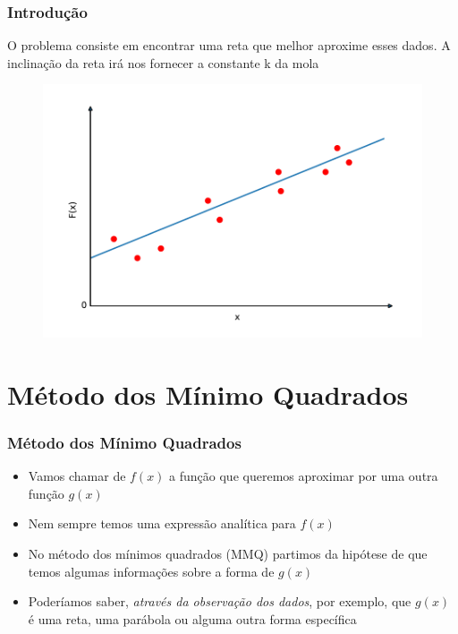 \documentclass{beamer}
\theoremstyle{mystyle}
\begin{document}
	\begin{frame}
		\frametitle{Introdução}	
		O problema consiste em encontrar uma reta que melhor aproxime esses dados. A inclinação da reta irá nos fornecer a constante k da mola
		\begin{figure}
			\centering
			\includegraphics[width=0.7\linewidth]{Figuras/grafico_01}
			\label{fig:grafico01}
		\end{figure}
	\end{frame}


\section{Método dos Mínimo Quadrados}
	\begin{frame}
		\frametitle{Método dos Mínimo Quadrados}	
		\begin{itemize}
			\item  Vamos chamar de $ f (x) $ a função que queremos aproximar por uma outra função $ g (x) $
			\item  Nem sempre temos uma expressão analítica para $ f (x) $		
			\item  No método dos mínimos quadrados (MMQ) partimos da hipótese de que temos algumas informações sobre a forma de $ g (x) $
			\item Poderíamos saber, \textit{através da observação dos dados}, por exemplo, que $ g (x) $ é uma reta, uma parábola ou alguma outra forma específica
		\end{itemize}
	\end{frame}
\end{document}

